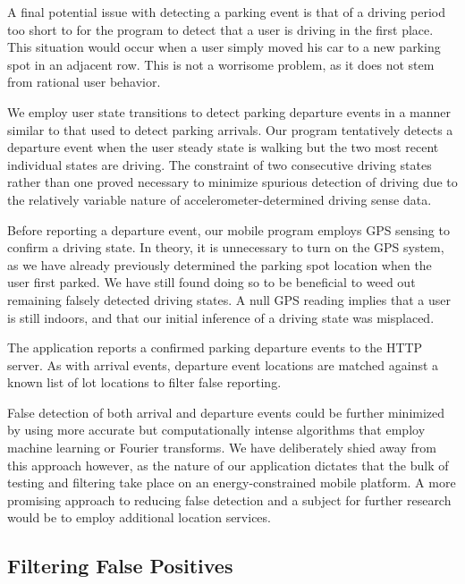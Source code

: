A final potential issue with detecting a parking event is that of a driving
period too short to for the program to detect that a user is driving in the
first place. This situation would occur when a user simply moved his car to a
new parking spot in an adjacent row. This is not a worrisome problem, as it
does not stem from rational user behavior.

We employ user state transitions to detect parking departure events in a
manner similar to that used to detect parking arrivals. Our program
tentatively detects a departure event when the user steady state is walking
but the two most recent individual states are driving. The constraint of two
consecutive driving states rather than one proved necessary to minimize
spurious detection of driving due to the relatively variable nature of
accelerometer-determined driving sense data.

Before reporting a departure event, our mobile program employs GPS sensing to
confirm a driving state. In theory, it is unnecessary to turn on the GPS
system, as we have already previously determined the parking spot location
when the user first parked. We have still found doing so to be beneficial to
weed out remaining falsely detected driving states. A null GPS reading
implies that a user is still indoors, and that our initial inference of a
driving state was misplaced.

The application reports a confirmed parking departure events to the HTTP
server. As with arrival events, departure event locations are matched against
a known list of lot locations to filter false reporting.

False detection of both arrival and departure events could be further
minimized by using more accurate but computationally intense algorithms that
employ machine learning or Fourier transforms. We have deliberately shied
away from this approach however, as the nature of our application dictates
that the bulk of testing and filtering take place on an energy-constrained
mobile platform. A more promising approach to reducing false detection and a
subject for further research would be to employ additional location services.

\subsection{Filtering False Positives}
\label{subsec-false}

